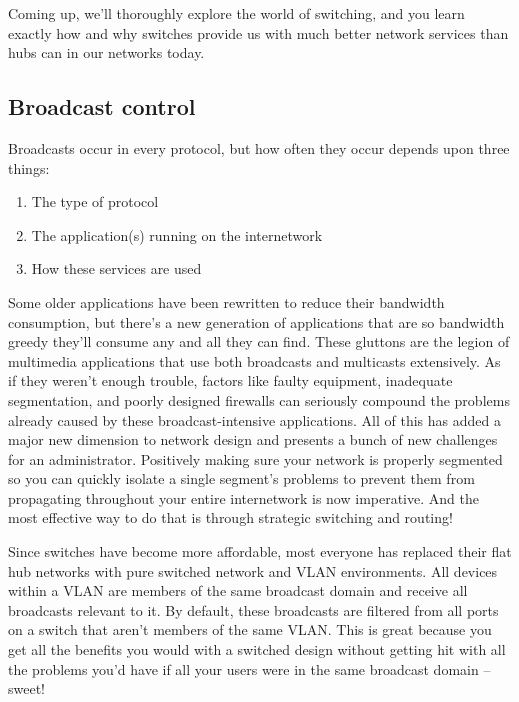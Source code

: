 Coming up, we'll thoroughly explore the world of switching, and you learn exactly how and why switches provide us with much better network services than hubs can in our networks today.



\subsection{Broadcast control}

Broadcasts occur in every protocol, but how often they occur depends upon three things:

\begin{enumerate}
   \item
      The type of protocol
   \item
      The application(s) running on the internetwork
   \item
      How these services are used
\end{enumerate}

Some older applications have been rewritten to reduce their bandwidth
consumption, but there's a new generation of applications that are so
bandwidth greedy they'll consume any and all they can find. These
gluttons are the legion of multimedia applications that use both
broadcasts and multicasts extensively. As if they weren't enough
trouble, factors like faulty equipment, inadequate segmentation, and
poorly designed firewalls can seriously compound the problems already
caused by these broadcast-intensive applications. All of this has added
a major new dimension to network design and presents a bunch of new
challenges for an administrator. Positively making sure your network is
properly segmented so you can quickly isolate a single segment's
problems to prevent them from propagating throughout your entire
internetwork is now imperative. And the most effective way to do that is
through strategic switching and routing!

Since switches have become more affordable, most everyone has replaced
their flat hub networks with pure switched network and VLAN
environments. All devices within a VLAN are members of the same
broadcast domain and receive all broadcasts relevant to it. By default,
these broadcasts are filtered from all ports on a switch that aren't
members of the same
VLAN. This is great because you get all the benefits you would with a
switched design without getting hit with all the problems you'd have if
all your users were in the same broadcast domain -- sweet!

